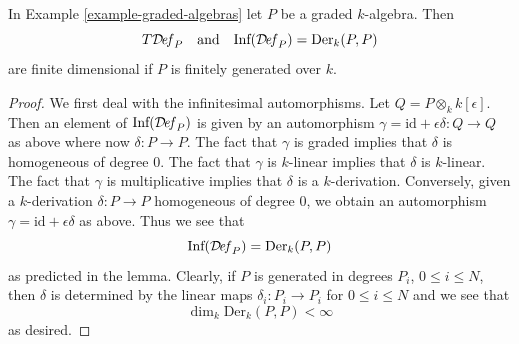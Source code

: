 \begin{lemma}
\label{lemma-graded-algebras-TI}
In Example \ref{example-graded-algebras} let $P$ be a graded $k$-algebra.
Then
$$
T\mathcal{D}\!\mathit{ef}_P
\quad\text{and}\quad
\text{Inf}(\mathcal{D}\!\mathit{ef}_P) = \text{Der}_k(P, P)
$$
are finite dimensional if $P$ is finitely generated over $k$.
\end{lemma}

\begin{proof}
We first deal with the infinitesimal automorphisms.
Let $Q = P \otimes_k k[\epsilon]$.
Then an element of $\text{Inf}(\mathcal{D}\!\mathit{ef}_P)$
is given by an automorphism
$\gamma = \text{id} + \epsilon \delta : Q \to Q$
as above where now $\delta : P \to P$.
The fact that $\gamma$ is graded implies that
$\delta$ is homogeneous of degree $0$.
The fact that $\gamma$ is $k$-linear implies that
$\delta$ is $k$-linear.
The fact that $\gamma$ is multiplicative implies that
$\delta$ is a $k$-derivation.
Conversely, given a $k$-derivation $\delta : P \to P$
homogeneous of degree $0$, we obtain an automorphism
$\gamma = \text{id} + \epsilon \delta$ as above.
Thus we see that
$$
\text{Inf}(\mathcal{D}\!\mathit{ef}_P) = \text{Der}_k(P, P)
$$
as predicted in the lemma.
Clearly, if $P$ is generated in degrees $P_i$,
$0 \leq i \leq N$, then $\delta$ is determined by
the linear maps $\delta_i : P_i \to P_i$ for
$0 \leq i \leq N$ and we see that
$$
\dim_k \text{Der}_k(P, P) < \infty
$$
as desired.


\end{proof}
